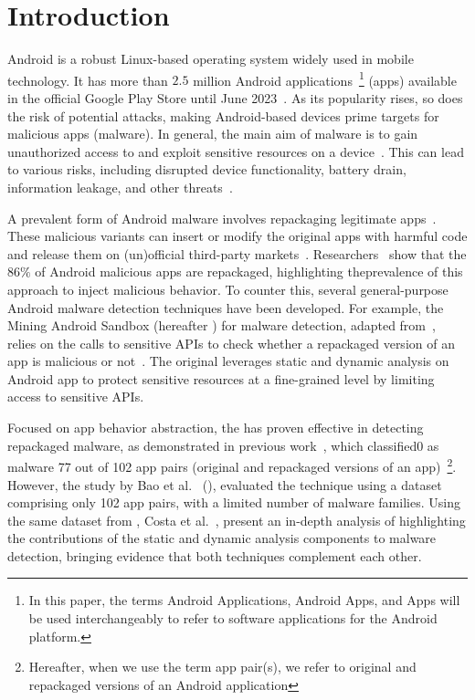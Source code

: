 \section{Introduction}\label{sec:introduction}


Android is a robust Linux-based operating system widely used in mobile technology. It has more than $2.5$ million Android applications~\footnote{In this paper, the terms Android Applications, Android Apps, and Apps will be used interchangeably to refer to software applications for the Android platform.} (apps) available in the official Google Play Store until June 2023~\cite{Statista}. As its popularity rises, so does the risk of potential attacks, making Android-based devices prime targets for malicious apps (malware). In general, the main aim of malware is to gain unauthorized access to and exploit sensitive resources on a device~\cite{DBLP:conf/ccs/FeltFCHW11,DBLP:journals/eswa/SurendranTE20}.
This can lead to various risks, including disrupted device functionality, battery drain, information leakage, and other threats~\cite{DBLP:conf/ccs/FeltFCHW11,DBLP:conf/sp/ZhouJ12}.

A prevalent form of Android malware involves repackaging legitimate apps~\cite{DBLP:conf/wcre/BaoLL18, le2018towards}. These malicious variants can insert or modify the original apps with harmful code and release them on (un)official third-party markets~\cite{DBLP:journals/tdsc/TianYRTP20}. Researchers~\cite{DBLP:journals/tdsc/TianYRTP20,DBLP:conf/sp/ZhouJ12,DBLP:journals/compsec/MerloRSV21} show that the $86\%$ of Android malicious apps are repackaged, highlighting theprevalence of this approach to inject malicious behavior. To counter this, several general-purpose Android malware detection techniques have been developed. For example, the Mining Android Sandbox (hereafter \mas) for malware detection, adapted from~\cite{DBLP:conf/icse/JamrozikSZ16}, relies on the calls to sensitive APIs to check whether a repackaged version of an app is malicious or not~\cite{DBLP:conf/wcre/BaoLL18,DBLP:jourals/jjc/Handrick22}. The original \mas leverages static and dynamic analysis on Android app to protect sensitive resources at a fine-grained level by limiting access to sensitive APIs.

Focused on app behavior abstraction, the \mas has proven effective in detecting repackaged malware, as demonstrated in previous work~\cite{DBLP:conf/wcre/BaoLL18}, which classified0 as malware 77 out of 102 app pairs (original and repackaged versions of an app)~\footnote{Hereafter, when we use the term app pair(s), we refer to original and repackaged versions of an Android application}. However, the study by Bao et al.~\cite{DBLP:conf/wcre/BaoLL18} (\blls), evaluated the technique using a dataset comprising only 102 app pairs, with a limited number of malware families. Using the same dataset from \blls, Costa et al.~\cite{DBLP:jourals/jjc/Handrick22}, present an in-depth analysis of \mas highlighting the contributions of the static and dynamic analysis components to malware detection, bringing evidence that both techniques complement each other. 

